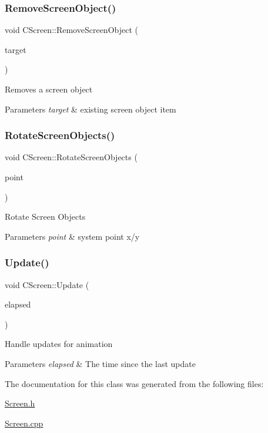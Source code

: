 \subsubsection{\texorpdfstring{RemoveScreenObject()}{RemoveScreenObject()}}
{\footnotesize\ttfamily void C\+Screen\+::\+Remove\+Screen\+Object (\begin{DoxyParamCaption}\item[{std\+::shared\+\_\+ptr$<$ \mbox{\hyperlink{class_c_screen_object}{C\+Screen\+Object}} $>$}]{target }\end{DoxyParamCaption})}

Removes a screen object 
\begin{DoxyParams}{Parameters}
{\em target} & existing screen object item \\
\hline
\end{DoxyParams}
\mbox{\label{class_c_screen_a9eeb298494ea922c2a803f09a4933935}} 
\subsubsection{\texorpdfstring{RotateScreenObjects()}{RotateScreenObjects()}}
{\footnotesize\ttfamily void C\+Screen\+::\+Rotate\+Screen\+Objects (\begin{DoxyParamCaption}\item[{C\+Point}]{point }\end{DoxyParamCaption})}

Rotate Screen Objects 
\begin{DoxyParams}{Parameters}
{\em point} & system point x/y \\
\hline
\end{DoxyParams}
\mbox{\label{class_c_screen_abb87ac8a63d45684c7ad6e4410be7583}} 
\subsubsection{\texorpdfstring{Update()}{Update()}}
{\footnotesize\ttfamily void C\+Screen\+::\+Update (\begin{DoxyParamCaption}\item[{double}]{elapsed }\end{DoxyParamCaption})}

Handle updates for animation 
\begin{DoxyParams}{Parameters}
{\em elapsed} & The time since the last update \\
\hline
\end{DoxyParams}


The documentation for this class was generated from the following files\+:\begin{DoxyCompactItemize}
\item 
\mbox{\hyperlink{_screen_8h}{Screen.\+h}}\item 
\mbox{\hyperlink{_screen_8cpp}{Screen.\+cpp}}\end{DoxyCompactItemize}

